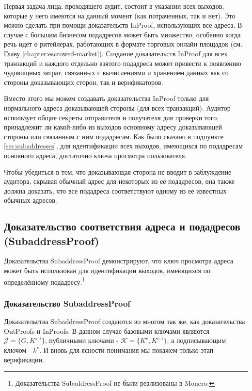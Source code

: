Первая задача лица, проходящего аудит, состоит в указании всех выходов, которые у него имеются на данный момент (как потраченных, так и нет). Это можно сделать при помощи доказательств InProof, использующих все адреса. В случае с большим бизнесом подадресов может быть множество, особенно когда речь идёт о ритейлерах, работающих в формате торговых онлайн площадок (см. Главу \ref{chapter:escrowed-market}). Создание доказательств InProof для всех транзак\-ций и каждого отдельно взятого подадреса может привести к появлению чудовищных затрат, связанных с вычислениями и хранением данных как со стороны доказывающих сторон, так и верификаторов.

Вместо этого мы можем создавать доказательства InProof только для нормального адреса доказывающей стороны (для всех транзакций). Аудитор использует общие секреты отправи\-теля и получателя для проверки того, принадлежит ли какой-либо из выходов основному адресу доказывающей стороны или связанным с ним подадресам. Как было сказано в подпунк\-те \ref{sec:subaddresses}, для идентификации всех выходов, имеющихся по подадресам основного адреса, доста\-точно ключа просмотра пользователя.

Чтобы убедиться в том, что доказывающая сторона не вводит в заблуждение аудитора, скрывая обычный адрес для некоторых из её подадресов, она также должна доказать, что все подадреса соответствуют одному из её известных обычных адресов.


\subsection{Доказательство соответствия адреса и подадресов (SubaddressProof)}
\label{subsec:proofs-address-subaddress-correspond-subaddressproof}

Доказательства SubaddressProof демонстрируют, что ключ просмотра адреса может быть использован для идентификации выходов, имеющихся по определённому подадресу.\footnote{Доказательства SubaddressProof не были реализованы в Monero.}

\subsubsection*{Доказательство SubaddressProof}
Доказательства SubaddressProof создаются во многом так же, как доказательства OutProofs и InProofs. В данном случае базовыми ключами являются $\mathcal{J} = \{G, K^{s,i}\}$, публичными ключами - $\mathcal{K} = \{K^v, K^{v,i}\}$, а подписывающим ключом - $k^v$. И вновь для ясности понимания мы покажем только этап верификации.

